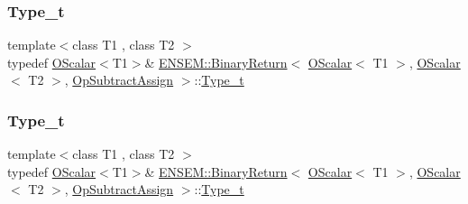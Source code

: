 \subsubsection{\texorpdfstring{Type\_t}{Type\_t}\hspace{0.1cm}{\footnotesize\ttfamily [1/3]}}
{\footnotesize\ttfamily template$<$class T1 , class T2 $>$ \\
typedef \mbox{\hyperlink{classENSEM_1_1OScalar}{O\+Scalar}}$<$T1$>$\& \mbox{\hyperlink{structENSEM_1_1BinaryReturn}{E\+N\+S\+E\+M\+::\+Binary\+Return}}$<$ \mbox{\hyperlink{classENSEM_1_1OScalar}{O\+Scalar}}$<$ T1 $>$, \mbox{\hyperlink{classENSEM_1_1OScalar}{O\+Scalar}}$<$ T2 $>$, \mbox{\hyperlink{structENSEM_1_1OpSubtractAssign}{Op\+Subtract\+Assign}} $>$\+::\mbox{\hyperlink{structENSEM_1_1BinaryReturn_3_01OScalar_3_01T1_01_4_00_01OScalar_3_01T2_01_4_00_01OpSubtractAssign_01_4_a56c648d7318d544c513534130a020867}{Type\+\_\+t}}}

\mbox{\label{structENSEM_1_1BinaryReturn_3_01OScalar_3_01T1_01_4_00_01OScalar_3_01T2_01_4_00_01OpSubtractAssign_01_4_a56c648d7318d544c513534130a020867}} 
\subsubsection{\texorpdfstring{Type\_t}{Type\_t}\hspace{0.1cm}{\footnotesize\ttfamily [2/3]}}
{\footnotesize\ttfamily template$<$class T1 , class T2 $>$ \\
typedef \mbox{\hyperlink{classENSEM_1_1OScalar}{O\+Scalar}}$<$T1$>$\& \mbox{\hyperlink{structENSEM_1_1BinaryReturn}{E\+N\+S\+E\+M\+::\+Binary\+Return}}$<$ \mbox{\hyperlink{classENSEM_1_1OScalar}{O\+Scalar}}$<$ T1 $>$, \mbox{\hyperlink{classENSEM_1_1OScalar}{O\+Scalar}}$<$ T2 $>$, \mbox{\hyperlink{structENSEM_1_1OpSubtractAssign}{Op\+Subtract\+Assign}} $>$\+::\mbox{\hyperlink{structENSEM_1_1BinaryReturn_3_01OScalar_3_01T1_01_4_00_01OScalar_3_01T2_01_4_00_01OpSubtractAssign_01_4_a56c648d7318d544c513534130a020867}{Type\+\_\+t}}}

